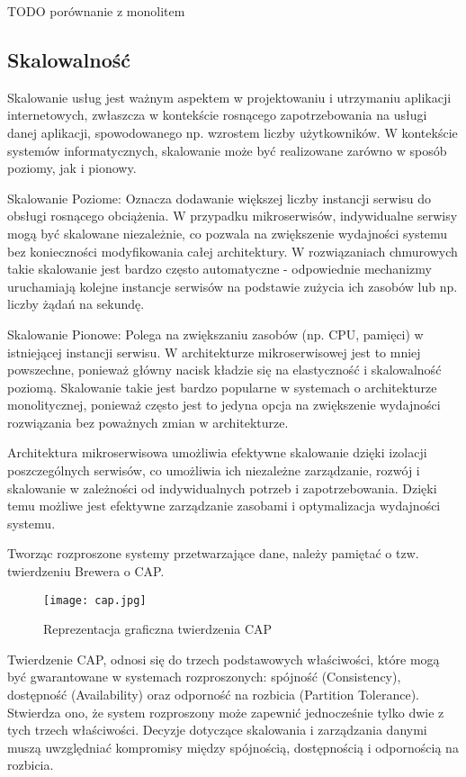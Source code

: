 TODO porównanie z monolitem

\subsection{Skalowalność}

Skalowanie usług jest ważnym aspektem w projektowaniu i utrzymaniu aplikacji internetowych, zwłaszcza w kontekście rosnącego zapotrzebowania na usługi danej aplikacji, spowodowanego np. wzrostem liczby użytkowników. W kontekście systemów informatycznych, skalowanie może być realizowane zarówno w sposób poziomy, jak i pionowy.

Skalowanie Poziome: Oznacza dodawanie większej liczby instancji serwisu do obsługi rosnącego obciążenia. W przypadku mikroserwisów, indywidualne serwisy mogą być skalowane niezależnie, co pozwala na zwiększenie wydajności systemu bez konieczności modyfikowania całej architektury. W rozwiązaniach chmurowych takie skalowanie jest bardzo często automatyczne - odpowiednie mechanizmy uruchamiają kolejne instancje serwisów na podstawie zużycia ich zasobów lub np. liczby żądań na sekundę.

Skalowanie Pionowe: Polega na zwiększaniu zasobów (np. CPU, pamięci) w istniejącej instancji serwisu. W architekturze mikroserwisowej jest to mniej powszechne, ponieważ główny nacisk kładzie się na elastyczność i skalowalność poziomą. Skalowanie takie jest bardzo popularne w systemach o architekturze monolitycznej, ponieważ często jest to jedyna opcja na zwiększenie wydajności rozwiązania bez poważnych zmian w architekturze.

Architektura mikroserwisowa umożliwia efektywne skalowanie dzięki izolacji poszczególnych serwisów, co umożliwia ich niezależne zarządzanie, rozwój i skalowanie w zależności od indywidualnych potrzeb i zapotrzebowania. Dzięki temu możliwe jest efektywne zarządzanie zasobami i optymalizacja wydajności systemu.

Tworząc rozproszone systemy przetwarzające dane, należy pamiętać o tzw. twierdzeniu Brewera o CAP.

\begin{figure}[!h]
    \centering \texttt{[image: cap.jpg]}
    \caption{Reprezentacja graficzna twierdzenia CAP \cite{rys2}}
\end{figure}

Twierdzenie CAP, odnosi się do trzech podstawowych właściwości, które mogą być gwarantowane w systemach rozproszonych: spójność (Consistency), dostępność (Availability) oraz odporność na rozbicia (Partition Tolerance). Stwierdza ono, że system rozproszony może zapewnić jednocześnie tylko dwie z tych trzech właściwości. Decyzje dotyczące skalowania i zarządzania danymi muszą uwzględniać kompromisy między spójnością, dostępnością i odpornością na rozbicia.

